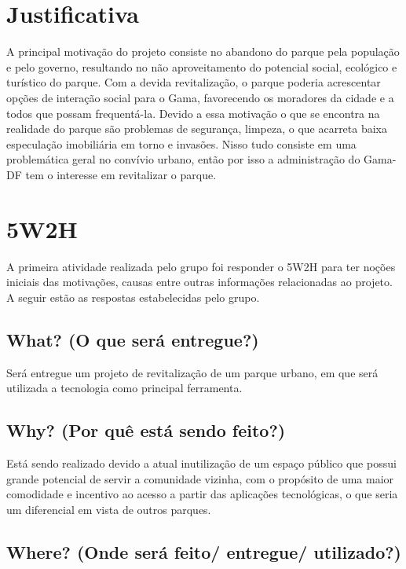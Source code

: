 \section{Justificativa}

A principal motiva\c{c}\~ao do projeto consiste no abandono do parque pela popula\c{c}\~ao e pelo governo, resultando no n\~ao aproveitamento do potencial social, ecol\'ogico e tur\'istico do parque. Com a devida revitaliza\c{c}\~ao, o parque poderia acrescentar op\c{c}\~oes de intera\c{c}\~ao social para o Gama, favorecendo os moradores da cidade e a todos que possam frequent\'a-la.
Devido a essa motiva\c{c}\~ao o que se encontra na realidade do parque s\~ao problemas de seguran\c{c}a, limpeza, o que acarreta baixa especula\c{c}\~ao imobili\'aria em torno e invas\~oes. Nisso tudo consiste em uma problem\'atica geral no conv\'ivio urbano, ent\~ao por isso a administra\c{c}\~ao do Gama-DF tem o interesse em revitalizar o parque.

\section{5W2H}

A primeira atividade realizada pelo grupo foi responder o 5W2H para ter no\c{c}\~oes iniciais das motiva\c{c}\~oes, causas entre outras informa\c{c}\~oes relacionadas ao projeto. A seguir est\~ao as respostas estabelecidas pelo grupo.

\subsection{What? (O que ser\'a entregue?)}

Ser\'a entregue um projeto de revitaliza\c{c}\~ao de um parque urbano, em que ser\'a utilizada a tecnologia como principal ferramenta.

\subsection{Why? (Por qu\^e est\'a sendo feito?)}

Est\'a sendo realizado devido a atual inutiliza\c{c}\~ao de um espa\c{c}o p\'ublico que possui grande potencial de servir a comunidade vizinha, com o prop\'osito de uma maior comodidade e incentivo ao acesso a partir das aplica\c{c}\~oes tecnol\'ogicas, o que seria um diferencial em vista de outros parques.

\subsection{Where? (Onde ser\'a feito/ entregue/ utilizado?)}

